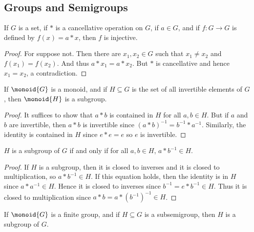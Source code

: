     \subsection{Groups and Semigroups}
        \begin{theorem}
            If $G$ is a set, if $*$ is a cancellative operation on $G$,
            if $a\in{G}$, and if $f:G\rightarrow{G}$ is defined by
            $f(x)=a*x$, then $f$ is injective.
        \end{theorem}
        \begin{proof}
            For suppose not. Then there are $x_{1},x_{2}\in{G}$ such that
            $x_{1}\ne{x}_{2}$ and $f(x_{1})=f(x_{2})$. And thus
            $a*x_{1}=a*x_{2}$. But $*$ is cancellative and hence
            $x_{1}=x_{2}$, a contradiction.
        \end{proof}
        \begin{theorem}
            If $\monoid{G}$ is a monoid, and if $H\subseteq{G}$ is the set
            of all invertible elements of $G$, then $\monoid{H}$ is a
            subgroup.
        \end{theorem}
        \begin{proof}
            It suffices to show that $a*b$ is contained in $H$ for all
            $a,b\in{H}$. But if $a$ and $b$ are invertible, then $a*b$ is
            invertible since
            $(a*b)^{\minus{1}}=b^{\minus{1}}*a^{\minus{1}}$. Similarly, the
            identity is contained in $H$ since $e*e=e$ so $e$ is invertible.
        \end{proof}
        \begin{theorem}
            $H$ is a subgroup of $G$ if and only if for all $a,b\in{H}$,
            $a*b^{\minus{1}}\in{H}$.
        \end{theorem}
        \begin{proof}
            If $H$ is a subgroup, then it is closed to inverses and it is
            closed to multiplication, so $a*b^{\minus{1}}\in{H}$. If this
            equation holds, then the identity is in $H$ since
            $a*a^{\minus{1}}\in{H}$. Hence it is closed to inverses since
            $b^{\minus{1}}=e*b^{\minus{1}}\in{H}$. Thus it is closed to
            multiplication since $a*b=a*(b^{\minus{1}})^{\minus{1}}\in{H}$.
        \end{proof}
        \begin{theorem}
            If $\monoid{G}$ is a finite group, and if $H\subseteq{G}$ is a
            subsemigroup, then $H$ is a subgroup of $G$.
        \end{theorem}
